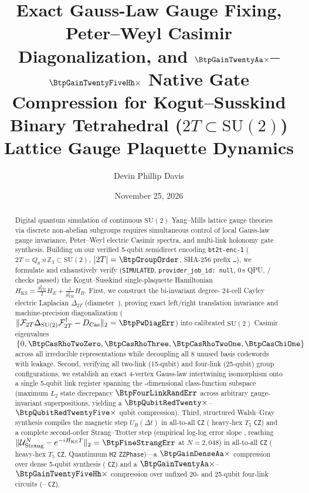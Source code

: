 \documentclass[twocolumn,aps,prapplied,superscriptaddress,floatfix]{revtex4-2}
\begin{document}
\title{Exact Gauss-Law Gauge Fixing, Peter--Weyl Casimir Diagonalization, and $\BtpGainTwentyAa\times$--$\BtpGainTwentyFiveHh\times$ Native Gate Compression for Kogut--Susskind Binary Tetrahedral ($2T \subset \mathrm{SU}(2)$) Lattice Gauge Plaquette Dynamics}

\author{Devin Phillip Davis}

\date{November 25, 2026}

\begin{abstract}
Digital quantum simulation of continuous $\mathrm{SU}(2)$ Yang--Mills lattice gauge theories via discrete non-abelian subgroups requires simultaneous control of local Gauss-law gauge invariance, Peter--Weyl electric Casimir spectra, and multi-link holonomy gate synthesis. Building on our verified 5-qubit semidirect encoding \texttt{bt2t-enc-1} ($2T = Q_8 \rtimes \mathbb{Z}_3 \subset \mathrm{SU}(2)$, $|2T|=\BtpGroupOrder$, SHA-256 prefix \texttt{\BtpEncShaPrefix\ldots}), we formulate and exhaustively verify (\texttt{SIMULATED}, \texttt{provider\_job\_id: null}, 0\,s QPU, \BtpChecksTotal/\BtpChecksTotal{} checks passed) the Kogut--Susskind single-plaquette Hamiltonian $H_{\mathrm{KS}} = \frac{g_{\mathrm{YM}}^2}{2} H_E + \frac{1}{g_{\mathrm{YM}}^2} H_B$. First, we construct the bi-invariant degree-\BtpCayleyDeg{} 24-cell Cayley electric Laplacian $\Delta_{2T}$ (diameter~\BtpCayleyDiam{}), proving exact left/right translation invariance and machine-precision diagonalization ($\|\mathcal{F}_{2T}\Delta_{\mathrm{SU}(2)}\mathcal{F}_{2T}^\dagger - D_{\mathrm{Cas}}\|_2 = \BtpPwDiagErr$) into calibrated $\mathrm{SU}(2)$ Casimir eigenvalues $\{0, \BtpCasRhoTwoZero, \BtpCasRhoThree, \BtpCasRhoTwoOne, \BtpCasChiOne\}$ across all \BtpConjClasses{} irreducible representations while decoupling all 8 unused basis codewords with \BtpUnusedLeak{} leakage. Second, verifying all \BtpTwoLinkConfigs{} two-link (15-qubit) and \BtpFourLinkConfigs{} four-link (25-qubit) group configurations, we establish an exact 4-vertex Gauss-law intertwining isomorphism onto a single 5-qubit link register spanning the \BtpGaussDim-dimensional class-function subspace (maximum $L_2$ state discrepancy $\BtpFourLinkRandErr$ across arbitrary gauge-invariant superpositions, yielding a $\BtpQubitRedTwenty\times$--$\BtpQubitRedTwentyFive\times$ qubit compression). Third, structured Walsh--Gray synthesis compiles the magnetic step $U_B(\Delta t)$ in \BtpCzUbAa{} all-to-all \texttt{CZ} (\BtpCzUbHh{} heavy-hex $T_5$ \texttt{CZ}) and a complete second-order Strang--Trotter step (empirical log-log error slope \BtpStrangSlopeGOne{}, reaching $\|\mathcal{U}_{\mathrm{Strang}}^N - e^{-i H_{\mathrm{KS}} T}\|_2 = \BtpFineStrangErr$ at $N=2{,}048$) in \BtpCzStrangAa{} all-to-all \texttt{CZ} (\BtpCzStrangHh{} heavy-hex $T_5$ \texttt{CZ}, \BtpZzStrangHtwo{} Quantinuum \texttt{H2} \texttt{ZZPhase})—a $\BtpGainDenseAa\times$ compression over dense 5-qubit synthesis (\BtpCzDenseAa{} \texttt{CZ}) and a $\BtpGainTwentyAa\times$--$\BtpGainTwentyFiveHh\times$ compression over unfixed 20- and 25-qubit four-link circuits (\BtpCzTwentyAa{}--\BtpCzTwentyFiveHh{} \texttt{CZ}).
\end{abstract}
\end{document}

